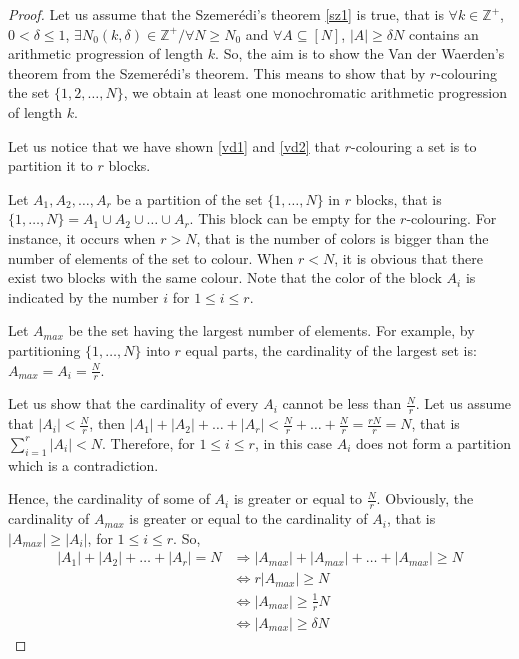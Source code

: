 \begin{proof}
  Let us assume that the Szemerédi's theorem \eqref{sz1} is true, that is $\forall k \in \mathbb{Z}^+$, $0< \delta \leq  1$, $\exists N_0(k,\delta) \in \mathbb{Z}^+/ \forall N \geq N_0$ and $ \forall A \subseteq [N]$, $|A|\geq \delta N$ contains an arithmetic progression of length $k.$ So, the aim is to show the  Van der Waerden's theorem from the Szemerédi's theorem. This means to  show that by $r$-colouring the set $\{1,2,\ldots, N\}$, we obtain at least one monochromatic arithmetic progression of length $k.$
  
   Let us notice that we have shown \eqref{vd1} and \eqref{vd2} that $r$-colouring a set  is to partition it to $r$ blocks.

   Let $A_1,A_2, \ldots, A_r$ be a partition of the set $\{1, \ldots, N\}$ in $r$ blocks, that is $ \{1, \ldots, N\} =A_1 \cup A_2 \cup \ldots \cup A_r$. This block can be empty for the $r$-colouring. For instance, it occurs when $r >N$, that is the number of colors is bigger than the number of elements of the set to colour. When $r <N$, it is obvious that there exist two blocks with the same colour. Note that the color of the block $A_i$ is indicated  by the number $i$  for $1\leq i \leq r.$ 

Let $A_{max}$ be the set having the largest number of elements. For example, by partitioning $\{1, \ldots, N\}$ into $r$ equal parts, the cardinality of the largest set is: $A_{max}=A_i=\frac{N}{r}$.

  Let us show that the cardinality of every $A_i$  cannot be less than $\frac{N}{r}$.
  Let us assume that  $|A_i| < \frac{N}{r}$,  then $|A_1|+|A_2|+ \ldots +|A_r| < \frac{N}{r}+\ldots +\frac{N}{r}=\frac{rN}{r}=N$,
 that is $\displaystyle{ \sum_{i=1}^{r}|A_i|<N}$. Therefore, for $1\leq i \leq r$, in this case $A_i$ does not form a partition which is a contradiction.

Hence, the cardinality of some of $A_i$ is greater or equal to  $\frac{N}{r}.$ 
Obviously, the cardinality of $A_{max}$ is greater or equal to the cardinality of $A_i$, that is $|A_{max}| \geq |A_i|$, for $1\leq i \leq r.$ So,
\begin{align*}
|A_1|+|A_2|+ \ldots +|A_r|=N & \Longrightarrow |A_{max}|+|A_{max}|+ \ldots +|A_{max}| \geq N \\  & \Longleftrightarrow r|A_{max}| \geq N \\
&  \Longleftrightarrow |A_{max}| \geq \frac{1}{r} N \\ 
& \Longleftrightarrow |A_{max}| \geq \delta N\end{align*}


\end{proof}
